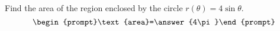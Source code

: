 \documentclass{ximera}
\author{Gregory Hartman \and Matthew Carr}
\begin{document}
\begin{exercise}





Find the area of the region enclosed by the circle $r(\theta)=4\sin\theta$.
\[
\begin{prompt}\text{area}=\answer{4\pi}\end{prompt}
\]

\end{exercise}
\end{document}
